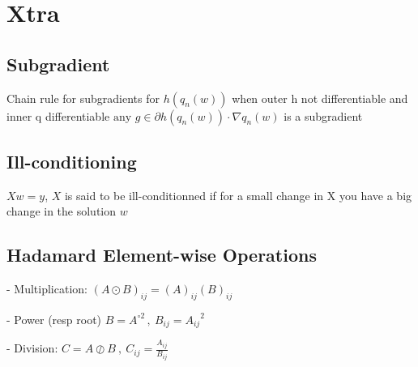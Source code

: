 \section*{Xtra}

\subsection*{Subgradient}
Chain rule for subgradients for $h(q_n(w))$ when outer h not differentiable and inner q differentiable 
$\text{any } g\in\partial h(q_n(w))\cdot{\nabla q_n(w)}$
is a subgradient

\subsection*{Ill-conditioning}

$Xw=y$, $X$ is said to be ill-conditionned if for a small change in X you have a big change in the solution $w$

\subsection*{Hadamard Element-wise Operations}

- Multiplication: $(A\odot B)_{ij}=(A)_{ij}(B)_{ij}$

- Power (resp root) $B=A^{\circ2} \,, \ B_{ij}={A_{ij}}^2$

- Division: $C=A\oslash B \ ,\ C_{ij}=\frac{A_{ij}}{B_{ij}}$